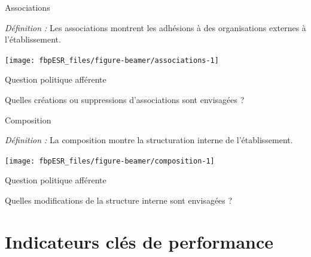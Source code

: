 \documentclass[
  8pt,
  french,
  ignorenonframetext,
  landscape]{beamer}
\begin{document}
\begin{frame}{Associations}
\protect\hypertarget{associations}{}

\emph{Définition :} Les associations montrent les adhésions à des
organisations externes à l'établissement.

\begin{center}\texttt{[image: fbpESR\_files/figure-beamer/associations-1]} \end{center}

\begin{block}{Question politique afférente}

Quelles créations ou suppressions d'associations sont envisagées ?

\end{block}

\end{frame}

\begin{frame}{Composition}
\protect\hypertarget{composition}{}

\emph{Définition :} La composition montre la structuration interne de
l'établissement.

\begin{center}\texttt{[image: fbpESR\_files/figure-beamer/composition-1]} \end{center}

\begin{block}{Question politique afférente}

Quelles modifications de la structure interne sont envisagées ?

\end{block}

\end{frame}

\hypertarget{indicateurs-cluxe9s-de-performance}{%
\section{Indicateurs clés de
performance}\label{indicateurs-cluxe9s-de-performance}}
\end{document}
